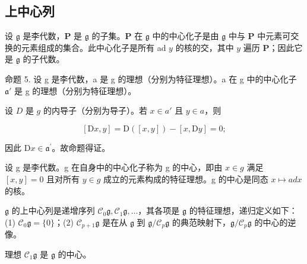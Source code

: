 \subsection{上中心列}

设 \(\mathfrak{g}\) 是李代数，\(\mathbf{P}\) 是 \(\mathfrak{g}\) 的子集。\(\mathbf{P}\) 在 \(\mathfrak{g}\) 中的中心化子是由 \(\mathfrak{g}\) 中与 \(\mathbf{P}\) 中元素可交换的元素组成的集合。此中心化子是所有 ad \(y\) 的核的交，其中 \(y\) 遍历 \(\mathbf{P}\)；因此它是 \(\mathfrak{g}\) 的子代数。

命题 5. 设 g 是李代数，a 是 g 的理想（分别为特征理想）。a 在 g 中的中心化子 \(\mathfrak{a}'\) 是 g 的理想（分别为特征理想）。

设 \(D\) 是 \(g\) 的内导子（分别为导子）。若 \(x \in a'\) 且 \(y \in a\)，则

\[
[ \mathrm{D} x, y ] = \mathrm{D} ([ x, y ]) - [ x, \mathrm{D} y ] = 0;
\]

因此 \(\mathrm{D}x\in \mathfrak{a}^{\prime}\)。故命题得证。

设 g 是李代数。g 在自身中的中心化子称为 g 的中心，即由 \(x \in g\) 满足 \([x, y] = 0\) 且对所有 \(y \in g\) 成立的元素构成的特征理想。g 的中心是同态 \(x \mapsto ad x\) 的核。

\(\mathfrak{g}\) 的上中心列是递增序列 \(\mathcal{C}_{0}\mathfrak{g},\mathcal{C}_{1}\mathfrak{g},\ldots\)，其各项是 \(\mathfrak{g}\) 的特征理想，递归定义如下：(1) \(\mathcal{C}_{0}\mathfrak{g} = \{0\}\)；(2) \(\mathcal{C}_{p + 1}\mathfrak{g}\) 是在从 \(\mathfrak{g}\) 到 \(\mathfrak{g} / \mathcal{C}_{p}\mathfrak{g}\) 的典范映射下，\(\mathfrak{g} / \mathcal{C}_{p}\mathfrak{g}\) 的中心的逆像。

理想 \(\mathcal{C}_{1}\mathfrak{g}\) 是 \(\mathfrak{g}\) 的中心。

